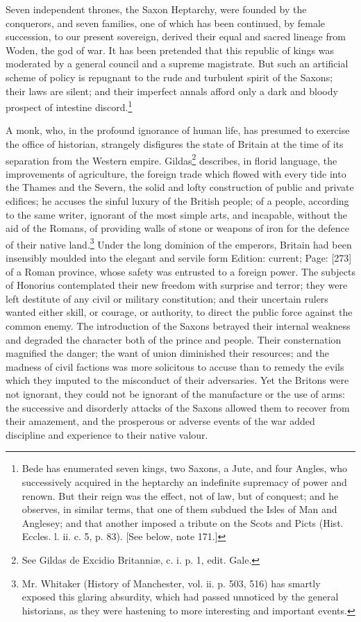 Seven independent thrones, the Saxon Heptarchy, were founded by the conquerors, and seven families, one of which has been continued, by female succession, to our present sovereign, derived their equal and sacred lineage from Woden, the god of war. It has been pretended that this republic of kings was moderated by a general council and a supreme magistrate. But such an artificial scheme of policy is repugnant to the rude and turbulent spirit of the Saxons; their laws are silent; and their imperfect annals afford only a dark and bloody prospect of intestine discord.\footnote{Bede has enumerated seven kings, two Saxons, a Jute, and four Angles, who successively acquired in the heptarchy an indefinite supremacy of power and renown. But their reign was the effect, not of law, but of conquest; and he observes, in similar terms, that one of them subdued the Isles of Man and Anglesey; and that another imposed a tribute on the Scots and Picts (Hist. Eccles. l. ii. c. 5, p. 83). [See below, note 171.]}

A monk, who, in the profound ignorance of human life, has presumed to exercise the office of historian, strangely disfigures the state of Britain at the time of its separation from the Western empire. Gildas\footnote{See Gildas de Excidio Britanniæ, c. i. p. 1, edit. Gale.} describes, in florid language, the improvements of agriculture, the foreign trade which flowed with every tide into the Thames and the Severn, the solid and lofty construction of public and private edifices; he accuses the sinful luxury of the British people; of a people, according to the same writer, ignorant of the most simple arts, and incapable, without the aid of the Romans, of providing walls of stone or weapons of iron for the defence of their native land.\footnote{Mr. Whitaker (History of Manchester, vol. ii. p. 503, 516) has smartly exposed this glaring absurdity, which had passed unnoticed by the general historians, as they were hastening to more interesting and important events.} Under the long dominion of the emperors, Britain had been insensibly moulded into the elegant and servile form Edition: current; Page: [273] of a Roman province, whose safety was entrusted to a foreign power. The subjects of Honorius contemplated their new freedom with surprise and terror; they were left destitute of any civil or military constitution; and their uncertain rulers wanted either skill, or courage, or authority, to direct the public force against the common enemy. The introduction of the Saxons betrayed their internal weakness and degraded the character both of the prince and people. Their consternation magnified the danger; the want of union diminished their resources; and the madness of civil factions was more solicitous to accuse than to remedy the evils which they imputed to the misconduct of their adversaries. Yet the Britons were not ignorant, they could not be ignorant of the manufacture or the use of arms: the successive and disorderly attacks of the Saxons allowed them to recover from their amazement, and the prosperous or adverse events of the war added discipline and experience to their native valour.

